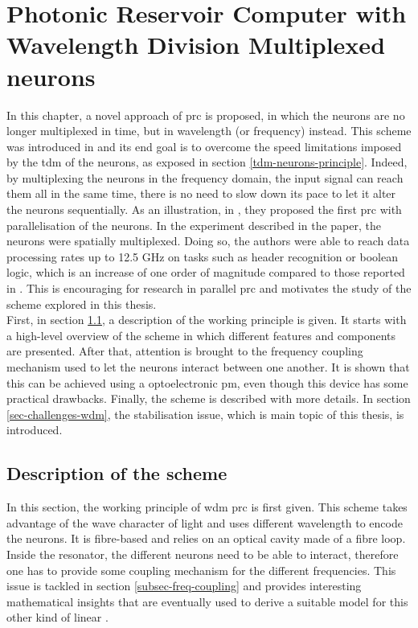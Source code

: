 \chapter{Photonic Reservoir Computer with Wavelength Division Multiplexed neurons}

\label{ch-wdm-rc}

In this chapter, a novel approach of \gls{prc} is proposed, in which the neurons are no longer multiplexed in time, but in wavelength (or frequency) instead. This scheme was introduced in \cite{AkroutAkram2016Pprc} and its end goal is to overcome the speed limitations imposed by the \gls{tdm} of the neurons, as exposed in section \ref{tdm-neurons-principle}. Indeed, by multiplexing the neurons in the frequency domain, the input signal can reach them all in the same time, there is no need to slow down its pace to let it alter the neurons sequentially. As an illustration, in \cite{Vandoorne2014}, they proposed the first \gls{prc} with parallelisation of the neurons. In the experiment described in the paper, the neurons were spatially multiplexed. Doing so, the authors were able to reach data processing rates up to 12.5 GHz on tasks such as header recognition or boolean logic, which is an increase of one order of magnitude compared to those reported in \cite{Vinckier2015}. This is encouraging for research in parallel \gls{prc} and motivates the study of the scheme explored in this thesis.\\

First, in section \ref{sec-scheme-wdm}, a description of the working principle is given. It starts with a high-level overview of the scheme in which different features and components are presented. After that, attention is brought to the frequency coupling mechanism used to let the neurons interact between one another. It is shown that this can be achieved using a optoelectronic \gls{pm}, even though this device has some practical drawbacks. Finally, the scheme is described with more details. In section \ref{sec-challenges-wdm}, the stabilisation issue, which is main topic of this thesis, is introduced.


\section{Description of the scheme}

\label{sec-scheme-wdm}

In this section, the working principle of \gls{wdm} \gls{prc} is first given. This scheme takes advantage of the wave character of light and uses different wavelength to encode the neurons. It is fibre-based and relies on an optical cavity made of a fibre loop. Inside the resonator, the different neurons need to be able to interact, therefore one has to provide some coupling mechanism for the different frequencies. This issue is tackled in section \ref{subsec-freq-coupling} and provides interesting mathematical insights that are eventually used to derive a suitable model for this other kind of linear \rcer.

